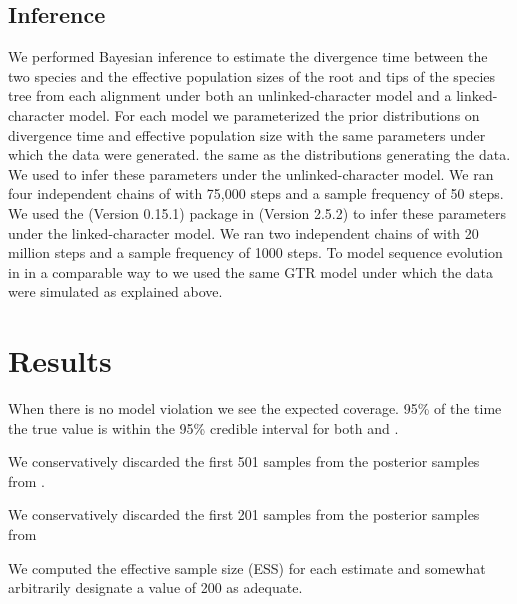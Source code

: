 \subsection{Inference}
We performed Bayesian inference to estimate the divergence time between the two species and the effective 
population sizes of the root and tips of the species tree from each alignment 
under both an unlinked-character model and a linked-character model. For each 
model we parameterized the prior distributions on divergence time and effective
population size with the same parameters under which the data were generated. 
the same as the distributions generating the data.
We used \ecoevolity
\citep[Version 0.3.2; dev branch commit a7e9bf2;][]{Oaks2018ecoevolity}
to infer these parameters under the 
unlinked-character model.
We ran four independent chains of \ecoevolity with 75,000 steps and a sample 
frequency of 50 steps.
We used the \beast (Version 0.15.1) \citep{@ogilvieStarBEAST2BringsFaster2017} 
package in \beastcore (Version 2.5.2) \citep{@bouckaertBEASTSoftwarePlatform2014}
to infer these parameters under the linked-character model. 
We ran two independent chains of \beast with 20 million steps and a 
sample frequency of 1000 steps. 
To model sequence evolution in \beast in a comparable way to \ecoevolity we used 
the same GTR model under which the data were simulated as explained above.


\section{Results}





When there is no model violation we see the expected coverage. 95\% of the time
the true value is within the 95\% credible interval for both \ecoevolity and \beast.

We conservatively discarded the first 501 samples from the posterior samples from 
\ecoevolity.

We conservatively discarded the first 201 samples from the posterior samples from 
\beast 




We computed the effective sample size (ESS) for each estimate and somewhat arbitrarily
designate a value of 200 as adequate.

